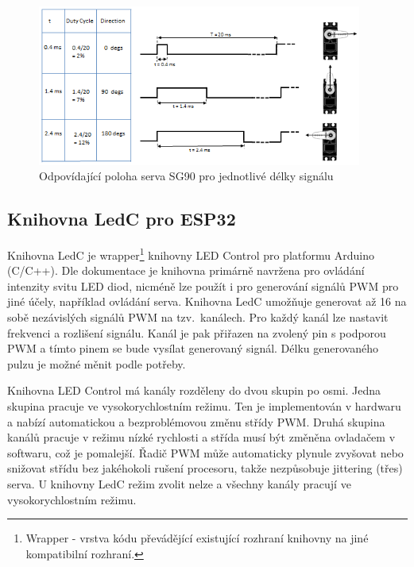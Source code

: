 \begin{figure}[hbt]
	\centering
	\includegraphics[width=0.95\textwidth]{obrazky-figures/servomot1.png}
	\caption[sg90]{Odpovídající poloha serva SG90 pro jednotlivé délky signálu\footnotemark}
	\label{sg90}
\end{figure}


\subsection*{Knihovna LedC pro ESP32}
Knihovna LedC je wrapper\footnote{Wrapper - vrstva kódu převádějící existující rozhraní knihovny na jiné kompatibilní rozhraní.} knihovny LED Control pro platformu Arduino (C/C++). Dle dokumentace \cite{servoLEDControl} je knihovna primárně navržena pro ovládání intenzity svitu LED diod, nicméně lze použít i pro generování signálů PWM pro jiné účely, například ovládání serva. Knihovna LedC umožňuje generovat až 16 na sobě nezávislých signálů PWM na tzv.~kanálech. Pro každý kanál lze nastavit frekvenci a rozlišení signálu. Kanál je pak přiřazen na zvolený pin s podporou PWM a tímto pinem se bude vysílat generovaný signál. Délku generovaného pulzu je možné měnit podle potřeby.

Knihovna LED Control má kanály rozděleny do dvou skupin po osmi. Jedna skupina pracuje ve vysokorychlostním režimu. Ten je implementován v hardwaru a nabízí automatickou a bezproblémovou změnu střídy PWM. Druhá skupina kanálů pracuje v režimu nízké rychlosti a střída musí být změněna ovladačem v softwaru, což je pomalejší. Řadič PWM může automaticky plynule zvyšovat nebo snižovat střídu bez jakéhokoli rušení procesoru, takže nezpůsobuje jittering (třes) serva. U knihovny LedC režim zvolit nelze a všechny kanály pracují ve vysokorychlostním režimu.




